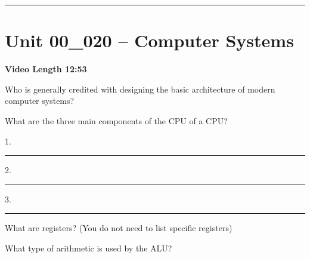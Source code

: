 \documentclass[letterpaper,12pt]{exam}
\newcommand{\unit}{Unit 00}
\begin{document}
\begin{questions}
\rule{0.5\textwidth}{.4pt} %
 
\section*{\unit\_020 -- Computer Systems}
\par{\selectfont\textbf{Video Length 12:53}}
\begin{samepage}
    \question Who is generally credited with designing the basic architecture of modern computer systems?
    \vspace{5mm}
\end{samepage}
\par

\pagebreak
\begin{samepage}
    \question What are the three main components of the CPU of a CPU?
    
    \vspace{5mm}
    \begin{Large}
         1. \rule{2cm}{0.15mm}  2. \rule{2cm}{0.15mm}  3. \rule{4cm}{0.15mm}
    \end{Large}
\end{samepage}
\par
 \begin{samepage}
     \question What are registers? (You do not need to list specific registers)
     \vspace{5mm}
 \end{samepage}
 \par
 \begin{samepage}
     \question What type of arithmetic is used by the ALU?
     \vspace{5mm}
 \end{samepage}
 \par
   

\end{questions}
\end{document}

